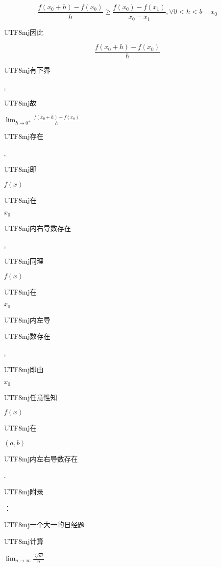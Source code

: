 \documentclass[10pt]{article}
\begin{document}
$$
\frac{f\left(x_{0}+h\right)-f\left(x_{0}\right)}{h} \geq \frac{f\left(x_{0}\right)-f\left(x_{1}\right)}{x_{0}-x_{1}}, \forall 0<h<b-x_{0}
$$
\begin{CJK}{UTF8}{mj}因此\end{CJK}
$$
\frac{f\left(x_{0}+h\right)-f\left(x_{0}\right)}{h}
$$
\begin{CJK}{UTF8}{mj}有下界\end{CJK}, \begin{CJK}{UTF8}{mj}故\end{CJK} $\lim _{h \rightarrow 0^{+}} \frac{f\left(x_{0}+h\right)-f\left(x_{0}\right)}{h}$ \begin{CJK}{UTF8}{mj}存在\end{CJK}, \begin{CJK}{UTF8}{mj}即\end{CJK} $f(x)$ \begin{CJK}{UTF8}{mj}在\end{CJK} $x_{0}$ \begin{CJK}{UTF8}{mj}内右导数存在\end{CJK}, \begin{CJK}{UTF8}{mj}同理\end{CJK} $f(x)$ \begin{CJK}{UTF8}{mj}在\end{CJK} $x_{0}$ \begin{CJK}{UTF8}{mj}内左导\end{CJK} \begin{CJK}{UTF8}{mj}数存在\end{CJK}, \begin{CJK}{UTF8}{mj}即由\end{CJK} $x_{0}$ \begin{CJK}{UTF8}{mj}任意性知\end{CJK} $f(x)$ \begin{CJK}{UTF8}{mj}在\end{CJK} $(a, b)$ \begin{CJK}{UTF8}{mj}内左右导数存在\end{CJK}.

\begin{CJK}{UTF8}{mj}附录\end{CJK}：\begin{CJK}{UTF8}{mj}一个大一的日经题\end{CJK}

\begin{CJK}{UTF8}{mj}计算\end{CJK} $\lim _{n \rightarrow \infty} \frac{\sqrt[n]{n !}}{n}$
\end{document}
